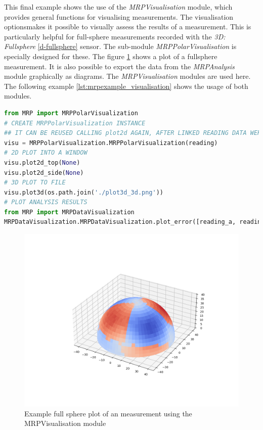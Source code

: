 This final example shows the use of the \emph{MRPVisualisation} module,
which provides general functions for visualising measurements. The
visualisation optionsmakes it possible to visually assess the results of
a measurement. This is particularly helpful for full-sphere measurements
recorded with the \emph{3D: Fullsphere} \ref{d-fullsphere} sensor. The
sub-module \emph{MRPPolarVisualisation} is specially designed for these.
The figure
\ref{Example_full_sphere_plot_of_an_measurement_using_the_MRPVisualisation_module.png}
shows a plot of a fullsphere measurement. It is also possible to export
the data from the \emph{MRPAnalysis} module graphically as diagrams. The
\emph{MRPVisualisation} modules are used here. The following example
\ref{lst:mrpexample_visualisation} shows the usage of both modules.

\begin{lstlisting}[language=Python, caption={MRPVisualisation example which plots a fullsphere to an image file}, label=lst:mrpexample_visualisation]
from MRP import MRPPolarVisualization
# CREATE MRPPolarVisualization INSTANCE
## IT CAN BE REUSED CALLING plot2d AGAIN, AFTER LINKED READING DATA WERE MODIFIED
visu = MRPPolarVisualization.MRPPolarVisualization(reading)
# 2D PLOT INTO A WINDOW
visu.plot2d_top(None)
visu.plot2d_side(None)
# 3D PLOT TO FILE
visu.plot3d(os.path.join('./plot3d_3d.png'))
# PLOT ANALYSIS RESULTS
from MRP import MRPDataVisualization
MRPDataVisualization.MRPDataVisualization.plot_error([reading_a, reading_b, reading_c])
\end{lstlisting}

\begin{figure}
\centering
\includegraphics{./generated_images/border_Example_full_sphere_plot_of_an_measurement_using_the_MRPVisualisation_module.png}
\caption{Example full sphere plot of an measurement using the
MRPVisualisation module
\label{Example_full_sphere_plot_of_an_measurement_using_the_MRPVisualisation_module.png}}
\end{figure}

